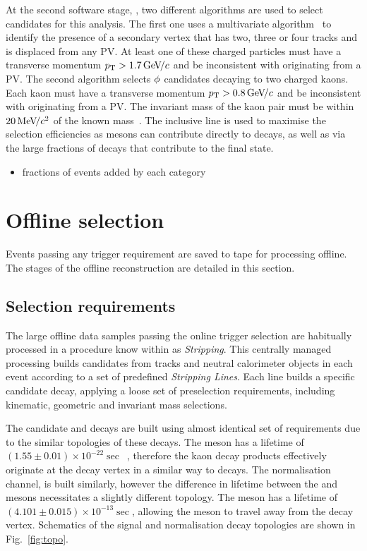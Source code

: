 At the second software stage, \hlttwo, two different algorithms are used to select candidates for this analysis.
The first one uses a multivariate algorithm~\cite{BBDT} to identify the presence of a secondary vertex that has two, three or four tracks and is displaced from any PV. At least one of these charged particles must have a transverse momentum $\mbox{$p_{\mathrm{ T}}$} > 1.7{\mathrm{\,Ge\kern -0.1em V\!/}c}$ and be inconsistent with originating from a PV. 
The second algorithm selects $\phi$ candidates decaying to two charged kaons. Each kaon must have a transverse momentum $\mbox{$p_{\mathrm{ T}}$} > 0.8{\mathrm{\,Ge\kern -0.1em V\!/}c}$ and be inconsistent with originating from a PV. The invariant mass of the kaon pair must be within $20{\mathrm{\,Me\kern -0.1em V\!/}c^2}$ of the known \phiz mass~\cite{PDG2016}.
The inclusive \phiz line is used to maximise the selection efficiencies as \phiz mesons can contribute directly to \decay{\Bp}{\Dsp\phiz} decays, as well as via the large fractions of \decay{\Dsp}{\phiz\pip} decays that contribute to the \decay{\Dsp}{\Kp\Km\pip} final state.

{\color{Red}
\begin{itemize}
\item fractions of events added by each category
\end{itemize}
}

\section{Offline selection}

Events passing any trigger requirement are saved to tape for processing offline. The stages of the offline reconstruction are detailed in this section.

\subsection{Selection requirements}
\label{sec:selectionrequirements}

The large offline data samples passing the online trigger selection are habitually processed in a procedure know within \lhcb as \emph{Stripping}. This centrally managed processing builds candidates from tracks and neutral calorimeter objects in each event according to a set of predefined \emph{Stripping Lines}. Each line builds a specific candidate decay, applying a loose set of preselection requirements, including kinematic, geometric and invariant mass selections. 

The candidate \decay{\Bp}{\Dsp\phiz} and \decay{\Bp}{\Dsp\Kp\Km} decays are built using almost identical set of requirements due to the similar topologies of these decays. The \phiz meson has a lifetime of $(1.55\pm0.01)\times10^{-22}\sec$~\cite{PDG2016}, therefore the kaon decay products effectively originate at the \Bp decay vertex in a similar way to \decay{\Bp}{\Dsp\Kp\Km} decays.  The normalisation channel, \decay{\Bp}{\Dsp\Dzb} is built similarly, however the difference in lifetime between the \Dzb and \phiz mesons necessitates a slightly different topology. The \Dzb meson has a lifetime of $(4.101\pm0.015)\times10^{-13}\sec$, allowing the meson to travel away from the \Bp decay vertex. Schematics of the signal and normalisation decay topologies are shown in Fig.~\ref{fig:topo}.

